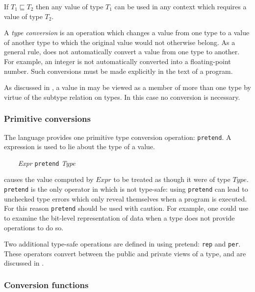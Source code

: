 If $T_1 \sqsubseteq T_2$ then any value of type $T_1$ can be used in any
context which requires a value of type $T_2$.



A {\em type conversion\/} is an operation which changes a value from
one type to a value of another type to which the original value would
not otherwise belong.  As a general rule, \asharp{} does not
automatically convert a value from one type to another.  For example, an
integer is not automatically converted into a floating-point number.
Such conversions must be made explicitly in the text of a program.

As discussed in , a value in \asharp{}
may be viewed as a member of more than one type by virtue of the subtype
relation on types.  In this case no conversion is necessary.

\subsubsection{Primitive conversions}

The language provides one primitive type conversion operation:  \verb"pretend".
A  expression is used to lie about the type of a value.

\verb"    "{\it Expr} {\tt pretend} {\it Type}

causes the value computed by $Expr$ to be treated as though it were
of type $Type$.  \verb"pretend" is the only operator in \asharp{} which
is not type-safe:  using \verb"pretend" can lead to unchecked type errors
which only reveal themselves when a program is executed.  For this reason
\verb"pretend" should be used with caution.
For example, one could use  to examine the bit-level
representation of data when a type does not provide operations
to do so.

Two additional type-safe operations are defined in \asharp{} using pretend:
{\tt rep} and {\tt per}.  These operators convert between the 
public and private views of a type, and are discussed in
.

\subsubsection{Conversion functions}

